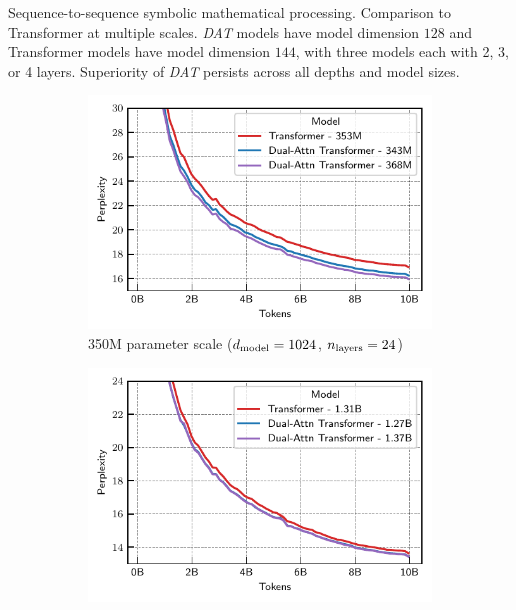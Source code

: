 \documentclass[letterpaper]{article}
\begin{document}
\begin{table}
    \centering
    \caption{Sequence-to-sequence symbolic mathematical processing. Comparison to Transformer at multiple scales. \textit{DAT} models have model dimension $128$ and Transformer models have model dimension $144$, with three models each with 2, 3, or 4 layers. Superiority of \textit{DAT} persists across all depths and model sizes.}
    
\end{table}

\begin{figure}[ht]
    \begin{subfigure}{0.44\textwidth}
        \centering
        \captionsetup{width=.9\linewidth}
        \includegraphics[width=\textwidth]{figs/experiments/fineweb/350M_scale_lm.pdf}
        \caption{350M parameter scale ($d_{\mathrm{model}} = 1024$, $n_{\mathrm{layers}} = 24$)}
    \end{subfigure}
    \begin{subfigure}{0.44\textwidth}
        \centering
        \captionsetup{width=.9\linewidth}
        \includegraphics[width=\textwidth]{figs/experiments/fineweb/1_3B_scale_lm.pdf}

\end{subfigure}
\end{figure}
\end{document}
